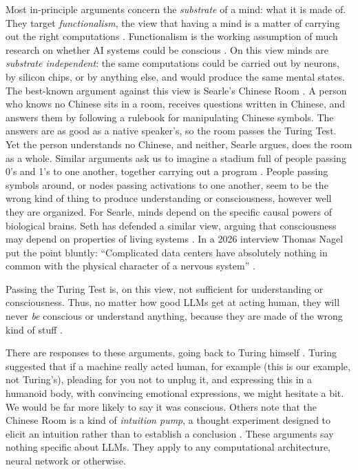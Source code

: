 Most in-principle arguments concern the \emph{substrate} of a mind: what it is
made of. They target \emph{functionalism}, the view that having a mind is a
matter of carrying out the right computations \cite{putnam1967psychological,
fodor1981mind}. Functionalism is the working assumption of much research on
whether AI systems could be conscious \cite{butlin2023consciousness}. On this
view minds are \emph{substrate independent}: the same computations could be
carried out by neurons, by silicon chips, or by anything else, and would
produce the same mental states. The best-known argument against this view is
Searle's Chinese Room \cite{searle1980minds}. A person who knows no Chinese
sits in a room, receives questions written in Chinese, and answers them by
following a rulebook for manipulating Chinese symbols. The answers are as good
as a native speaker's, so the room passes the Turing Test. Yet the person
understands no Chinese, and neither, Searle argues, does the room as a whole.
Similar arguments ask us to imagine a stadium full of people passing 0's and
1's to one another, together carrying out a program
\cite{noelle2022artificial}. People passing symbols around, or nodes passing
activations to one another, seem to be the wrong kind of thing to produce
understanding or consciousness, however well they are organized. For Searle,
minds depend on the specific causal powers of biological brains. Seth has
defended a similar view, arguing that consciousness may depend on properties of
living systems \cite{seth2025conscious}. In a 2026 interview Thomas Nagel put
the point bluntly: ``Complicated data centers have absolutely nothing in common
with the physical character of a nervous system'' \cite{levy2026nagel}.

Passing the Turing Test is, on this view, not sufficient for understanding or
consciousness. Thus, no matter how good LLMs get at acting human, they will
never \emph{be} conscious or understand anything, because they are made of the
wrong kind of stuff \cite{hamid2023chatgpt}. 

There are responses to these arguments, going back to Turing himself
\cite{turing1950computing}. Turing suggested that if a
machine really acted human, for example (this is our example, not Turing's), pleading for you not to unplug it, and expressing this in a humanoid body,  with convincing emotional expressions, we might hesitate a bit. We would be far more likely to say it was conscious. Others note that the Chinese Room is a kind of  \emph{intuition
pump}, a thought experiment designed to elicit an intuition rather than to
establish a conclusion \cite{dennett1980milk}. These
arguments say nothing specific about LLMs. They apply to any
computational architecture, neural network or otherwise.

